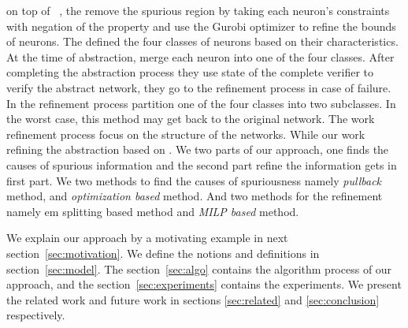 on top of \deeppoly{}~\cite{singh2019abstract}, the remove
the spurious region by taking each neuron's constraints with negation of the property and use the 
Gurobi optimizer \cite{gurobioptimizer} to refine the bounds of neurons.
The \cite{elboher2020abstraction} defined the four classes of neurons based on their characteristics.
At the time of abstraction, \cite{elboher2020abstraction} merge each neuron into one of the four classes. 
After completing the abstraction process they use state of the complete verifier to verify 
the abstract network, they go to the refinement process in case of failure.  
In the refinement process \cite{elboher2020abstraction} partition one of the four classes into two subclasses. 
In the worst case, this method may get back to the original network. 
The work \cite{elboher2020abstraction} refinement process focus on the structure of the networks. 
While our work refining the abstraction based on \deeppoly{}.
We two parts of our approach, one finds the causes of spurious information and the second part refine the 
information gets in first part. We two methods to find the causes of spuriousness namely {\em pullback} method, and 
{\em optimization based} method. And two methods for the refinement namely {em splitting} based method and 
{\em MILP based} method.    

We explain our approach by a motivating example in next section~\ref*{sec:motivation}. 
We define the notions and definitions in section~\ref{sec:model}. The section~\ref{sec:algo} contains the 
algorithm process of our approach, and the section~\ref{sec:experiments} contains the experiments. 
We present the related work and future work in sections \ref{sec:related} and \ref{sec:conclusion} respectively. 


